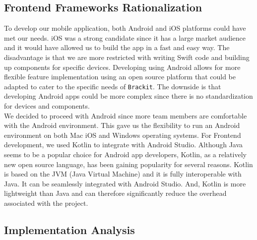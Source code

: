 \documentclass{article}
\begin{document}
\subsection{Frontend Frameworks Rationalization}
To develop our mobile application, both Android and iOS platforms could have met our needs.
iOS was a strong candidate since it has a large market audience and it would have allowed us to build the app in a fast and easy way. The disadvantage is that we are more restricted with writing Swift code and building up components for specific devices.
Developing using Android allows for more flexible feature implementation using an open source platform that could be adapted to cater to the specific needs of \texttt{Brackit}.
The downside is that developing Android apps could be more complex since there is no standardization for devices and components. \\
We decided to proceed with Android since more team members are comfortable with the Android environment. This gave us the flexibility to run an Android environment on both Mac iOS and Windows operating systems.
For Frontend development, we used Kotlin to integrate with Android Studio. Although Java seems to be a popular choice for Android app developers, Kotlin, as a relatively new open source language, has been gaining popularity for several reasons.
Kotlin is based on the JVM (Java Virtual Machine) and it is fully interoperable with Java. It can be seamlessly integrated with Android Studio. And, Kotlin is more lightweight than Java and can therefore significantly reduce the overhead associated with the project.

\subsection{Implementation Analysis}
\end{document}
